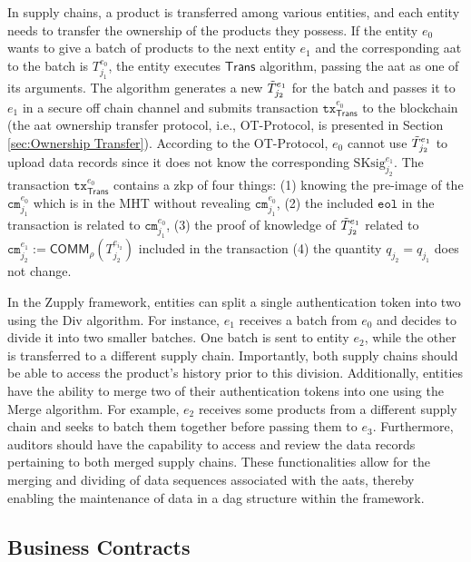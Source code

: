 In supply chains, a product is transferred among various entities, and each entity needs to transfer the ownership of the products they possess. If the entity $e_{0}$ wants to give a batch of products to the next entity $e_{1}$ and the corresponding \gls{aat} to the batch is $T^{e_{0}}_{j_1}$, the entity executes $\mathsf{Trans}$ algorithm, passing the \gls{aat} as one of its arguments. The algorithm generates a new $\Tilde{T}^{e_{1}}_{j_2}$ for the batch and passes it to $e_{1}$ in a secure off chain channel and submits transaction $\texttt{tx}^{e_{0}}_\mathsf{Trans}$ to the blockchain (the \gls{aat} ownership transfer protocol, i.e., \textsf{OT-Protocol}, is presented in Section \ref{sec:Ownership Transfer}). According to the \textsf{OT-Protocol}, $e_{0}$ cannot use $\Tilde{T}^{e_{1}}_{j_2}$ to upload data records since it does not know the corresponding $\text{SKsig}^{e_{1}}_{j_2}$. The transaction $\texttt{tx}^{e_{0}}_\mathsf{Trans}$ contains a \gls{zkp} of four things: (1) knowing the pre-image of the $\texttt{cm}_{j_1}^{e_{0}}$ which is in the \textsf{MHT} without revealing $\texttt{cm}_{j_1}^{e_{0}}$, (2) the included $\texttt{eol}$ in the transaction is related to  $\texttt{cm}_{j_1}^{e_{0}}$, (3) the proof of knowledge of $\Tilde{T}^{e_{1}}_{j_2}$ related to $\texttt{cm}^{e_{1}}_{j_2} := \mathsf{COMM}_\rho(T^{e_{i_2}}_{j_2})$ included in the transaction (4) the quantity $q_{j_2}=q_{j_1}$ does not change.

In the Zupply framework, entities can split a single authentication token into two using the \textsf{Div} algorithm. For instance, ${e_{1}}$ receives a batch from ${e_{0}}$ and decides to divide it into two smaller batches. One batch is sent to entity ${e_{2}}$, while the other is transferred to a different supply chain. Importantly, both supply chains should be able to access the product's history prior to this division. Additionally, entities have the ability to merge two of their authentication tokens into one using the \textsf{Merge} algorithm. For example, ${e_{2}}$ receives some products from a different supply chain and seeks to batch them together before passing them to ${e_{3}}$. Furthermore, auditors should have the capability to access and review the data records pertaining to both merged supply chains. These functionalities allow for the merging and dividing of data sequences associated with the \gls{aat}s, thereby enabling the maintenance of data in a \gls{dag} structure within the framework.



\subsection{Business Contracts}
\label{App:Business Contracts}


